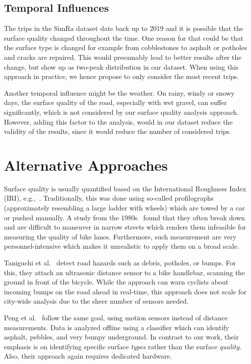 \subsection{Temporal Influences}
\label{subsec:temporal_influences}
The trips in the SimRa dataset date back up to 2019 and it is possible that the surface quality changed throughout the time.
One reason for that could be that the surface type is changed for example from cobblestones to asphalt or potholes and cracks are repaired.
This would presumably lead to better results after the change, but show up as two-peak distribution in our dataset.
When using this approach in practice, we hence propose to only consider the most recent trips.

Another temporal influence might be the weather.
On rainy, windy or snowy days, the surface quality of the road, especially with wet gravel, can suffer significantly, which is not considered by our surface quality analysis approach.
However, adding this factor to the analysis, would in our dataset reduce the validity of the results, since it would reduce the number of considered trips.


\section{Alternative Approaches}
\label{sec:related_work_cyclequality}
Surface quality is usually quantified based on the International Roughness Index (IRI), e.g.,~\cite{sayers1986The}.
Traditionally, this was done using so-called profilographs (approximately resembling a large ladder with wheels) which are towed by a car or pushed manually.
A study from the 1980s~\cite{cumbaa1986road} found that they often break down and are difficult to maneuver in narrow streets which renders them infeasible for measuring the quality of bike lanes.
Furthermore, such measurement are very personnel-intensive which makes it unrealistic to apply them on a broad scale.

Taniguchi et al.~\cite{taniguchi2015evaluation} detect road hazards such as debris, potholes, or bumps.
For this, they attach an ultrasonic distance sensor to a bike handlebar, scanning the ground in front of the bicycle.
While the approach can warn cyclists about incoming bumps on the road ahead in real-time, this approach does not scale for city-wide analysis due to the sheer number of sensors needed.

Peng et al.~\cite{peng2019road} follow the same goal, using motion sensors instead of distance measurements.
Data is analyzed offline using a classifier which can identify asphalt, pebbles, and very bumpy underground.
In contrast to our work, their emphasis is on identifying specific surface \textit{types} rather than the surface \textit{quality}.
Also, their approach again requires dedicated hardware.

